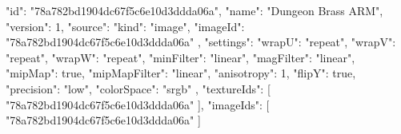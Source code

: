 {
  "id": "78a782bd1904dc67f5c6e10d3ddda06a",
  "name": "Dungeon Brass ARM",
  "version": 1,
  "source": {
    "kind": "image",
    "imageId": "78a782bd1904dc67f5c6e10d3ddda06a"
  },
  "settings": {
    "wrapU": "repeat",
    "wrapV": "repeat",
    "wrapW": "repeat",
    "minFilter": "linear",
    "magFilter": "linear",
    "mipMap": true,
    "mipMapFilter": "linear",
    "anisotropy": 1,
    "flipY": true,
    "precision": "low",
    "colorSpace": "srgb"
  },
  "textureIds": [
    "78a782bd1904dc67f5c6e10d3ddda06a"
  ],
  "imageIds": [
    "78a782bd1904dc67f5c6e10d3ddda06a"
  ]
}
